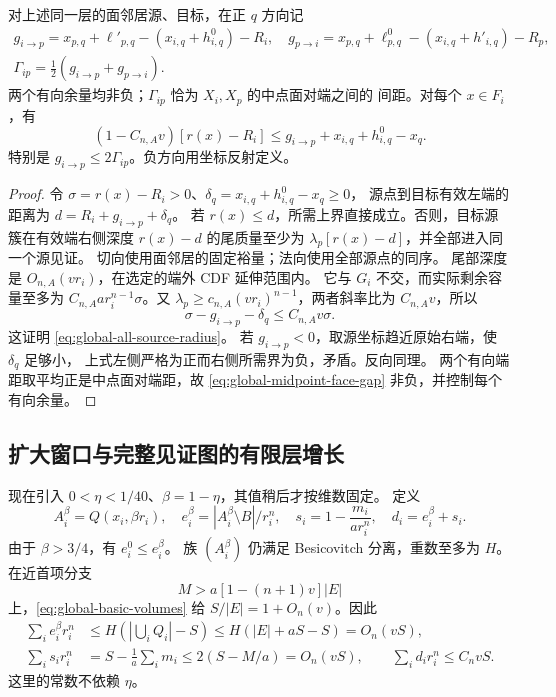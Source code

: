 \begin{lemma}[全部源点的面对容量]\label{lem:global-all-source-face}
对上述同一层的面邻居源、目标，在正 \(q\) 方向记
\begin{gather}
 g_{i\to p}=x_{p,q}+\ell'_{p,q}-(x_{i,q}+h^0_{i,q})-R_i,
 \quad
 g_{p\to i}=x_{p,q}+\ell^0_{p,q}-(x_{i,q}+h'_{i,q})-R_p,
 \label{eq:global-directed-face-gaps}\\
 \Gamma_{ip}=\tfrac12(g_{i\to p}+g_{p\to i}).
 \label{eq:global-midpoint-face-gap}
\end{gather}
两个有向余量均非负；\(\Gamma_{ip}\) 恰为 \(X_i,X_p\) 的中点面对端之间的
间距。对每个 \(x\in F_i\)，有
\begin{equation}\label{eq:global-all-source-radius}
 (1-C_{n,A}v)[r(x)-R_i]
 \le g_{i\to p}+x_{i,q}+h^0_{i,q}-x_q.
\end{equation}
特别是 \(g_{i\to p}\le2\Gamma_{ip}\)。负方向用坐标反射定义。
\end{lemma}
\begin{proof}
令 \(\sigma=r(x)-R_i>0\)、\(\delta_q=x_{i,q}+h^0_{i,q}-x_q\ge0\)，
源点到目标有效左端的距离为 \(d=R_i+g_{i\to p}+\delta_q\)。
若 \(r(x)\le d\)，所需上界直接成立。否则，目标源簇在有效端右侧深度
\(r(x)-d\) 的尾质量至少为 \(\lambda_p[r(x)-d]\)，并全部进入同一个源见证。
切向使用面邻居的固定裕量；法向使用全部源点的同序。
尾部深度是 \(O_{n,A}(vr_i)\)，在选定的端外 CDF 延伸范围内。
它与 \(G_i\) 不交，而实际剩余容量至多为
\(C_{n,A}ar_i^{n-1}\sigma\)。又
\(\lambda_p\ge c_{n,A}(vr_i)^{n-1}\)，两者斜率比为 \(C_{n,A}v\)，所以
\[
 \sigma-g_{i\to p}-\delta_q\le C_{n,A}v\sigma.
\]
这证明 \eqref{eq:global-all-source-radius}。
若 \(g_{i\to p}<0\)，取源坐标趋近原始右端，使 \(\delta_q\) 足够小，
上式左侧严格为正而右侧所需界为负，矛盾。反向同理。
两个有向端距取平均正是中点面对端距，故
\eqref{eq:global-midpoint-face-gap} 非负，并控制每个有向余量。
\end{proof}

\subsection{扩大窗口与完整见证图的有限层增长}

现在引入 \(0<\eta<1/40\)、\(\beta=1-\eta\)，其值稍后才按维数固定。
定义
\[
 A_i^\beta=Q(x_i,\beta r_i),\quad
 e_i^\beta=|A_i^\beta\setminus B|/r_i^n,\quad
 s_i=1-\frac{m_i}{ar_i^n},\quad d_i=e_i^\beta+s_i.
\]
由于 \(\beta>3/4\)，有 \(e_i^0\le e_i^\beta\)。
族 \((A_i^\beta)\) 仍满足 Besicovitch 分离，重数至多为 \(H\)。
在近首项分支
\begin{equation}\label{eq:global-near-saturation}
 M>a[1-(n+1)v]|E|
\end{equation}
上，\eqref{eq:global-basic-volumes} 给 \(S/|E|=1+O_n(v)\)。因此
\begin{equation}\label{eq:global-deficit-integral}
 \begin{aligned}
 \sum_i e_i^\beta r_i^n
 &\le H\left(\left|\bigcup_iQ_i\right|-S\right)
 \le H(|E|+aS-S)=O_n(vS),\\
 \sum_i s_ir_i^n
 &=S-\frac1a\sum_i m_i\le2(S-M/a)=O_n(vS),\qquad
 \sum_i d_ir_i^n\le C_nvS.
 \end{aligned}
\end{equation}
这里的常数不依赖 \(\eta\)。

